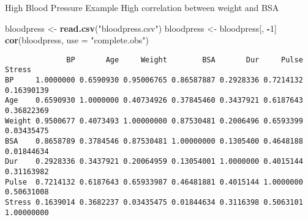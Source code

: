 \documentclass[
  ignorenonframetext,
]{beamer}
\newenvironment{Shaded}{\begin{snugshade}}{\end{snugshade}}
\newcommand{\AttributeTok}[1]{\textcolor[rgb]{0.13,0.29,0.53}{#1}}
\newcommand{\DecValTok}[1]{\textcolor[rgb]{0.00,0.00,0.81}{#1}}
\newcommand{\FunctionTok}[1]{\textcolor[rgb]{0.13,0.29,0.53}{\textbf{#1}}}
\newcommand{\NormalTok}[1]{#1}
\newcommand{\OtherTok}[1]{\textcolor[rgb]{0.56,0.35,0.01}{#1}}
\newcommand{\SpecialCharTok}[1]{\textcolor[rgb]{0.81,0.36,0.00}{\textbf{#1}}}
\newcommand{\StringTok}[1]{\textcolor[rgb]{0.31,0.60,0.02}{#1}}
\begin{document}
\begin{frame}[fragile]{High Blood Pressure Example}
\protect\hypertarget{high-blood-pressure-example-1}{}
High correlation between weight and BSA

\scriptsize

\begin{Shaded}
\begin{Highlighting}[]
\NormalTok{bloodpress }\OtherTok{\textless{}{-}} \FunctionTok{read.csv}\NormalTok{(}\StringTok{"bloodpress.csv"}\NormalTok{)}
\NormalTok{bloodpress }\OtherTok{\textless{}{-}}\NormalTok{ bloodpress[, }\SpecialCharTok{{-}}\DecValTok{1}\NormalTok{]}
\FunctionTok{cor}\NormalTok{(bloodpress, }\AttributeTok{use =} \StringTok{"complete.obs"}\NormalTok{)}
\end{Highlighting}
\end{Shaded}

\begin{verbatim}
              BP       Age     Weight        BSA       Dur     Pulse     Stress
BP     1.0000000 0.6590930 0.95006765 0.86587887 0.2928336 0.7214132 0.16390139
Age    0.6590930 1.0000000 0.40734926 0.37845460 0.3437921 0.6187643 0.36822369
Weight 0.9500677 0.4073493 1.00000000 0.87530481 0.2006496 0.6593399 0.03435475
BSA    0.8658789 0.3784546 0.87530481 1.00000000 0.1305400 0.4648188 0.01844634
Dur    0.2928336 0.3437921 0.20064959 0.13054001 1.0000000 0.4015144 0.31163982
Pulse  0.7214132 0.6187643 0.65933987 0.46481881 0.4015144 1.0000000 0.50631008
Stress 0.1639014 0.3682237 0.03435475 0.01844634 0.3116398 0.5063101 1.00000000
\end{verbatim}

\normalsize
\end{frame}
\end{document}
